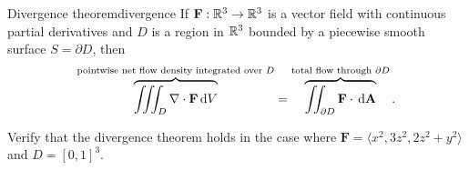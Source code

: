 \documentclass{watsonbook}
\begin{document}
\begin{theo}{Divergence theorem}{divergence}
  If $\mathbf{F} : \mathbb{R}^3 \to \mathbb{R}^3$ is a vector field with continuous
  partial derivatives and $D$ is a region in $\mathbb{R}^3$ bounded by a
  piecewise smooth surface $S = \partial D$, then 
  \[
    \overbrace{\iiint_D \nabla \cdot \mathbf{F} \,
      \mathrm{d} V}^{\text{pointwise net flow density
        integrated over $D$}} = \overbrace{\iint_{\partial D}
    \mathbf{F} \cdot \, {\mathrm{d}}\mathbf{A}}^{\text{total flow through
      $\partial D$}}. 
  \]
\end{theo}

\begin{example}{}{}
  Verify that the divergence theorem holds in the case where
  $\mathbf{F} = \langle x^2, 3z^2, 2z^2 + y^2 \rangle$ and $D = [0,1]^3$. 
\end{example}
\end{document}
